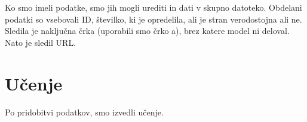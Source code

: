 \documentclass[sigconf,nonacm]{acmart}
\begin{document}
Ko smo imeli podatke, smo jih mogli urediti in dati v skupno datoteko. Obdelani podatki so vsebovali ID, številko, ki je opredelila, ali je stran verodostojna ali ne. Sledila je naključna črka (uporabili smo črko a), brez katere model ni deloval. Nato je sledil URL. 

\section{Učenje}
Po pridobitvi podatkov, smo izvedli učenje.



\end{document}
